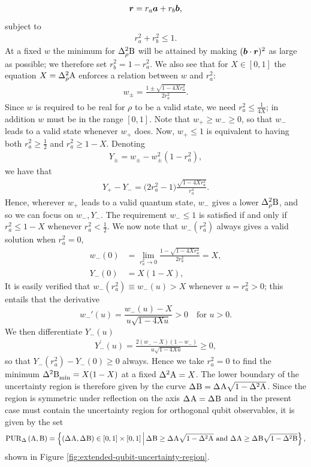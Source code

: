 \begin{align}
  \bm{r} = r_a \bm{a} + r_b \bm{b},
\end{align}
subject to
\begin{align}
  r_a^2 + r_b^2 \leq 1.
\end{align}
At a fixed $w$ the minimum for $\varr{\opb}$ will be attained by making $(\bm{b}\cdot\bm{r})^2$ as large as possible; we therefore set $r_b^2 = 1-r_a^2$. We also see that for $X\in [0,1]$ the equation $X = \varr{\opa}$ enforces a relation between $w$ and $r_a^2$: 
\begin{align}
  w_\pm = \frac{1\pm\sqrt{1 -4 X r_a^2}}{2r_a^2}.
\end{align}
Since $w$ is required to be real for $\rho$ to be a valid state, we need $r_a^2 \leq \frac{1}{4X}$; in addition $w$ must be in the range $[0,1]$. Note that  $w_+\ge w_-\ge 0$, so that $w_-$ leads to a valid state whenever $w_+$ does. Now, $w_+\le 1$ is equivalent to having both $r_a^2\ge\frac12$ and $r_a^2\ge 1-X$. Denoting
\begin{align}
  Y_\pm = w_\pm - w_\pm^2 (1-r_a^2),
\end{align}
we have that
\begin{align}
  Y_+ - Y_- =\bigl(2r_a^2-1\bigr)\frac{\sqrt{1-4 X r_a^2}}{r_a^4}.
\end{align}
Hence, wherever $w_+$ leads to a valid quantum state, $w_-$ gives a lower $\varr{\opb}$, and so we can focus on $w_-, Y_-$.
The requirement  $w_-\le 1$ is satisfied if and only if $r_a^2 \leq 1-X$ whenever $r_a^2 < \frac{1}{2}$. 
We now note that $w_-(r_a^2)$  always gives a valid solution when $r_a^2 = 0$,
\begin{align}
  w_-(0) &= \lim_{r_a^2 \to 0}  \frac{1 - \sqrt{1 -4 X r_a^2}}{2r_a^2} = X,\\
  Y_-(0) &= X(1-X),
\end{align}
It is easily verified that $w_-(r_a^2)\equiv w_-(u)>X$ whenever $u=r_a^2>0$; this entails that the derivative 
\begin{equation}\label{eq:w_->X}
w_-'(u)=\frac{w_-(u)-X}{u\sqrt{1-4Xu}}>0\quad\text{for }u>0.
\end{equation}
We then differentiate $Y_-(u)$
\begin{align}
  Y_-^\prime(u) = \frac{2(w_--X)(1-w_-)}{u\sqrt{1-4Xu}}\ge 0,
\end{align}
so that $Y_-(r_a^2) - Y_-(0)\ge 0$ always.
Hence we  take $r_a^2 = 0$ to find the minimum $\varmin{\opb}=X(1-X)$ at a fixed $\var{\opa}=X$. The lower boundary of the uncertainty region is therefore given by the curve $\sdev{\opb} = \sdev{\opa}\sqrt{1-\var{\opa}}$. Since the region is symmetric under reflection on the axis $\sdev\opa=\sdev\opb$ and in the present case must contain the uncertainty region for orthogonal qubit observables, it is given by the set
\begin{align}
  \PUR{\Delta}{\opa}{\opb} = \left\{(\sdev{\opa},\sdev{\opb})\in [0,1]\times[0,1]\, \middle|\, \sdev{\opb} \geq \sdev{\opa}\sqrt{1-\var{\opa}} \text{ and } \sdev{\opa} \geq \sdev{\opb}\sqrt{1-\var{\opb}}  \right\},%
\end{align}
shown in Figure \ref{fig:extended-qubit-uncertainty-region}.

